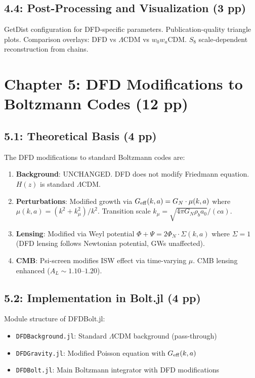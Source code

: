 \documentclass[11pt,a4paper]{article}
\begin{document}
\subsection{4.4: Post-Processing and Visualization (3 pp)}

GetDist configuration for DFD-specific parameters. Publication-quality triangle plots. Comparison overlays: DFD vs $\Lambda$CDM vs $w_0 w_a$CDM. $S_8$ scale-dependent reconstruction from chains.

\section{Chapter 5: DFD Modifications to Boltzmann Codes (12 pp)}

\subsection{5.1: Theoretical Basis (4 pp)}

The DFD modifications to standard Boltzmann codes are:

\begin{enumerate}
\item \textbf{Background}: UNCHANGED. DFD does not modify Friedmann equation. $H(z)$ is standard $\Lambda$CDM.

\item \textbf{Perturbations}: Modified growth via $G_{\rm eff}(k,a) = G_N \cdot \mu(k,a)$ where $\mu(k,a) = (k^2 + k_\mu^2)/k^2$. Transition scale $k_\mu = \sqrt{4\pi G_N \rho_b a_0}/(ca)$.

\item \textbf{Lensing}: Modified via Weyl potential $\Phi + \Psi = 2\Phi_N \cdot \Sigma(k,a)$ where $\Sigma = 1$ (DFD lensing follows Newtonian potential, GWs unaffected).

\item \textbf{CMB}: Psi-screen modifies ISW effect via time-varying $\mu$. CMB lensing enhanced ($A_L \sim 1.10$--$1.20$).
\end{enumerate}

\subsection{5.2: Implementation in Bolt.jl (4 pp)}

Module structure of DFDBolt.jl:
\begin{itemize}
\item \texttt{DFDBackground.jl}: Standard $\Lambda$CDM background (pass-through)
\item \texttt{DFDGravity.jl}: Modified Poisson equation with $G_{\rm eff}(k,a)$
\item \texttt{DFDBolt.jl}: Main Boltzmann integrator with DFD modifications
\end{itemize}
\end{document}
